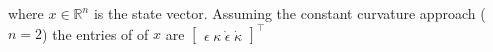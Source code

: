 where $x \in \mathbb{R}^{n}$ is the state vector. Assuming the constant curvature approach ($n = 2$) the entries of of $x$ are $ \begin{bmatrix} \epsilon \hspace{3pt} \kappa \hspace{3pt} \dot{\epsilon}  \hspace{3pt} \dot{\kappa}  \end{bmatrix}^{\top}  $












